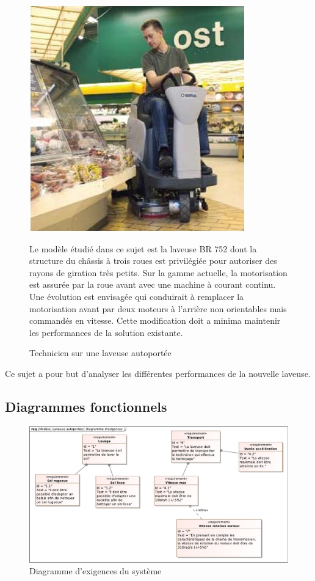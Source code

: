\begin{figure}[!h]
\begin{minipage}{0.4\linewidth}
\centering\includegraphics[width=0.8\linewidth]{img/img02}
 \caption{Technicien sur une laveuse autoportée}
 \label{img02}
\end{minipage} \hfill
\begin{minipage}{0.55\linewidth}
Le modèle étudié dans ce sujet est la laveuse BR 752 dont la structure du châssis à trois roues est privilégiée pour autoriser des rayons de giration très petits. Sur la gamme actuelle, la motorisation est assurée par la roue avant avec une machine à courant continu. Une évolution est envisagée qui conduirait à remplacer la motorisation avant par deux moteurs à l’arrière non orientables mais commandés en vitesse. Cette modification doit a minima maintenir les performances de la solution existante.
\end{minipage}
\end{figure}

Ce sujet a pour but d’analyser les différentes performances de la nouvelle laveuse.

\newpage

\subsection{Diagrammes fonctionnels}

\begin{figure}[!h]
\centering\includegraphics[width=0.8\linewidth]{img/Diagramme_d'exigences}
 \caption{Diagramme d'exigences du système}
 \label{img03}
\end{figure}


